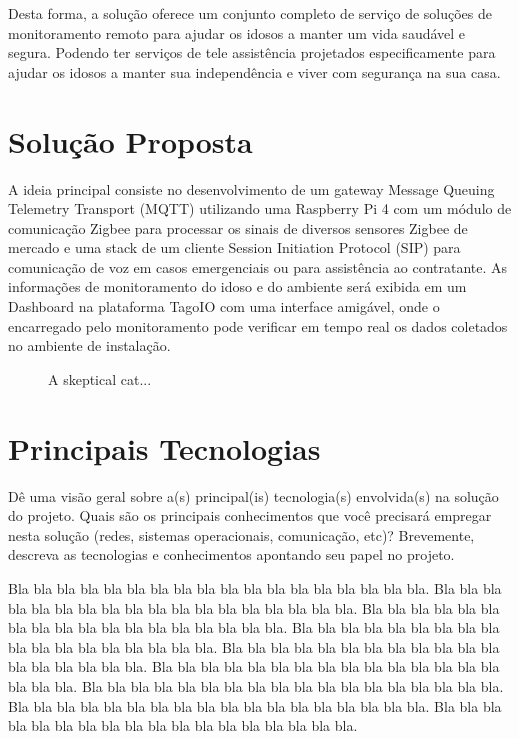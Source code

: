 \documentclass{acm_proc_article-sp}
\newcommand{\fig}[4][htb]{
  \begin{figure}[#1]
    {\centering{\texttt{[image: fig/\#2]}}\par}
    \caption{#3}
    \label{fig:#2}
  \end{figure}
}
\begin{document}
Desta forma, a solução oferece um conjunto completo de serviço de soluções de monitoramento remoto para ajudar os idosos a manter um vida saudável e segura. Podendo ter serviços de tele assistência projetados especificamente para ajudar os idosos a manter sua independência e viver com segurança na sua casa.

\section{Solução Proposta}

A ideia principal consiste
no desenvolvimento de um gateway Message Queuing Telemetry Transport (MQTT)
utilizando uma Raspberry Pi 4 com um módulo de comunicação Zigbee para processar os
sinais de diversos sensores Zigbee de mercado e uma stack de um cliente Session Initiation
Protocol (SIP) para comunicação de voz em casos emergenciais ou para assistência ao
contratante. As informações de monitoramento do idoso e do ambiente será exibida em um
Dashboard na plataforma TagoIO com uma interface amigável, onde o encarregado pelo
monitoramento pode verificar em tempo real os dados coletados no ambiente de instalação.

\fig{cat}{A skeptical cat...}{width=0.8\columnwidth}

\section{Principais Tecnologias}

Dê uma visão geral sobre a(s) principal(is) tecnologia(s) envolvida(s) na solução do projeto.
Quais são os principais conhecimentos que você precisará empregar nesta solução (redes, sistemas operacionais, comunicação, etc)?
Brevemente, descreva as tecnologias e conhecimentos apontando seu papel no projeto.

Bla bla bla bla bla bla bla bla bla bla bla bla bla bla bla bla bla bla.
Bla bla bla bla bla bla bla bla bla bla bla bla bla bla bla bla bla bla.
Bla bla bla bla bla bla bla bla bla bla bla bla bla bla bla bla bla bla.
Bla bla bla bla bla bla bla bla bla bla bla bla bla bla bla bla bla bla.
Bla bla bla bla bla bla bla bla bla bla bla bla bla bla bla bla bla bla.
Bla bla bla bla bla bla bla bla bla bla bla bla bla bla bla bla bla bla.
Bla bla bla bla bla bla bla bla bla bla bla bla bla bla bla bla bla bla.
Bla bla bla bla bla bla bla bla bla bla bla bla bla bla bla bla bla bla.
Bla bla bla bla bla bla bla bla bla bla bla bla bla bla bla bla bla bla.
\end{document}

